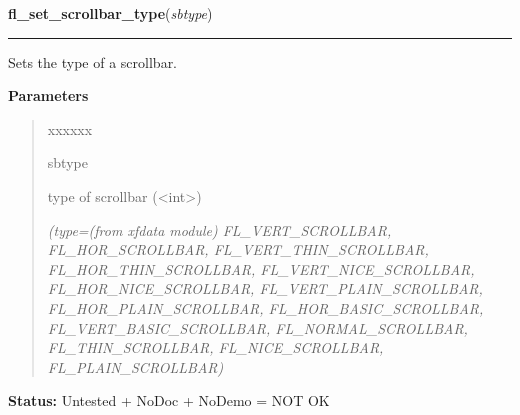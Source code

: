 \hspace{.8\funcindent}\begin{boxedminipage}{\funcwidth}

    \raggedright \textbf{fl\_set\_scrollbar\_type}(\textit{sbtype})

    \vspace{-1.5ex}

    \rule{\textwidth}{0.5\fboxrule}
\setlength{\parskip}{2ex}
    Sets the type of a scrollbar.

\setlength{\parskip}{1ex}
      \textbf{Parameters}
      \vspace{-1ex}

      \begin{quote}
        \begin{Ventry}{xxxxxx}

          \item[sbtype]

          type of scrollbar ({\textless}int{\textgreater})

            {\it (type=(from xfdata module) FL\_VERT\_SCROLLBAR, FL\_HOR\_SCROLLBAR, 
FL\_VERT\_THIN\_SCROLLBAR, FL\_HOR\_THIN\_SCROLLBAR, 
FL\_VERT\_NICE\_SCROLLBAR, FL\_HOR\_NICE\_SCROLLBAR, 
FL\_VERT\_PLAIN\_SCROLLBAR, FL\_HOR\_PLAIN\_SCROLLBAR, 
FL\_HOR\_BASIC\_SCROLLBAR, FL\_VERT\_BASIC\_SCROLLBAR, 
FL\_NORMAL\_SCROLLBAR, FL\_THIN\_SCROLLBAR, FL\_NICE\_SCROLLBAR, 
FL\_PLAIN\_SCROLLBAR)}

        \end{Ventry}

      \end{quote}

\textbf{Status:} Untested + NoDoc + NoDemo = NOT OK



    \end{boxedminipage}

    \label{xformslib:library:fl_set_thinscrollbar}

    \vspace{0.5ex}

